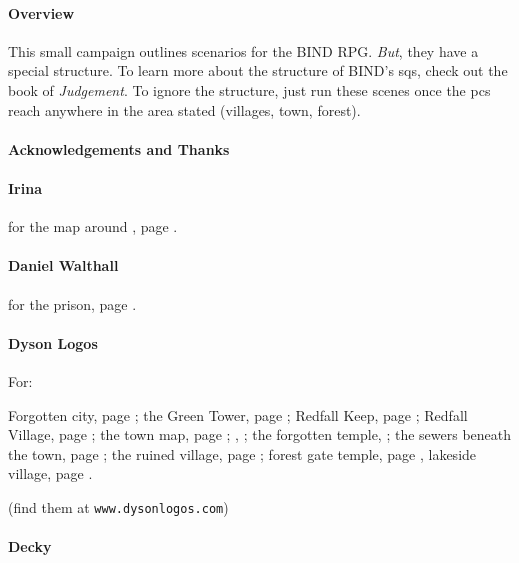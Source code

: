\begin{multicols}{2}

\paragraph{Overview}

This small campaign outlines scenarios for the BIND RPG.
\emph{But}, they have a special structure.
To learn more about the structure of BIND's \glspl{sq}, check out the book of \textit{Judgement}\iftoggle{judgement}{, \autopageref{sidequests}}{}.
To ignore the structure, just run these scenes once the \glspl{pc} reach anywhere in the area stated (villages, town, forest).

\paragraph{Acknowledgements and Thanks}

\paragraph{Irina}
for the map around , page \pageref{Irina/greylands}.

\paragraph{Daniel Walthall}
for the prison, page \pageref{Daniel_Walthall/prison}.

\paragraph{Dyson Logos}

For:

Forgotten city, page \pageref{Dyson_Logos/forgotten_city};
the Green Tower, page \pageref{Dyson_Logos/green_tower};
Redfall Keep, page \pageref{Dyson_Logos/redfall_keep};
Redfall Village, page \pageref{Dyson_Logos/redfall};
the town map, page \pageref{Dyson_Logos/town};
, \pageref{Dyson_Logos/mincing_pig};
the forgotten temple, \pageref{Dyson_Logos/qualme_temple};
the sewers beneath the town, page \pageref{Dyson_Logos/sewer};
the ruined village, page \pageref{Dyson_Logos/ruined_village};
forest gate temple, page \pageref{Dyson_Logos/shadow_gate},
lakeside village, page \pageref{Dyson_Logos/lakeside}.

(find them at {\tt www.dysonlogos.com})

\paragraph{Decky}


\end{multicols}

